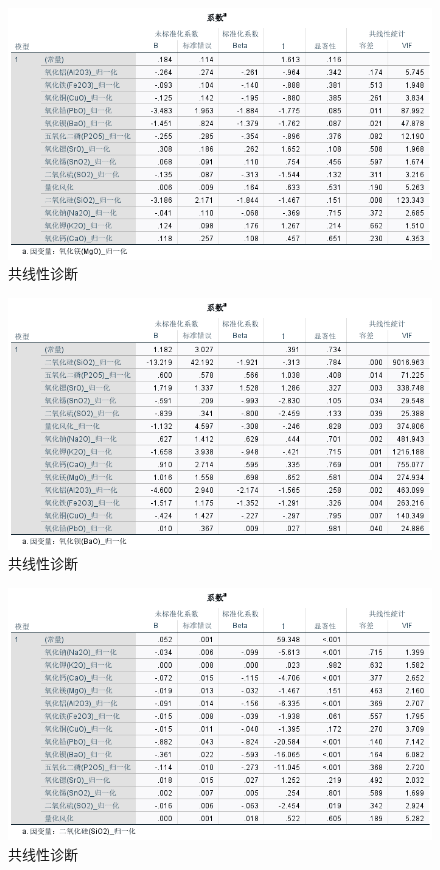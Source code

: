 \documentclass[UTF8]{ctexart}
\begin{document}
\begin{figure}[H]\centering
    \includegraphics[width=1\textwidth,height=0.6\textwidth]{img/1 (6).png} %
    \caption{共线性诊断} %
\end{figure}
\begin{figure}[H]\centering
    \includegraphics[width=1\textwidth,height=0.6\textwidth]{img/1 (7).png} %
    \caption{共线性诊断} %
\end{figure}
\begin{figure}[H]\centering
    \includegraphics[width=1\textwidth,height=0.6\textwidth]{img/1 (8).png} %
    \caption{共线性诊断} %
\end{figure}
\end{document}
